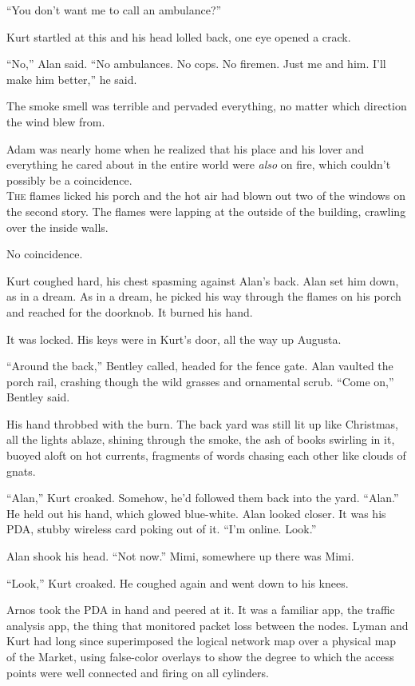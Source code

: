 \documentclass{article}
\begin{document}
``You don't want me to call an ambulance?''

Kurt startled at this and his head lolled back, one eye opened a
crack.

``No,'' Alan said.  ``No ambulances.  No cops.  No firemen.  Just me
and him.  I'll make him better,'' he said.

The smoke smell was terrible and pervaded everything, no matter which
direction the wind blew from. 

Adam was nearly home when he realized that his place and his lover and
everything he cared about in the entire world were \textit{also} on
fire, which couldn't possibly be a coincidence.
\\
\lettrine[lines=3, lhang=.5, nindent=0pt, findent=2pt]{T}{he} flames licked his porch and the hot air had blown out two of the
windows on the second story.  The flames were lapping at the outside
of the building, crawling over the inside walls. 

No coincidence. 

Kurt coughed hard, his chest spasming against Alan's back.  Alan set
him down, as in a dream.  As in a dream, he picked his way through the
flames on his porch and reached for the doorknob.  It burned his hand. 

It was locked.  His keys were in Kurt's door, all the way up Augusta.

``Around the back,'' Bentley called, headed for the fence gate.  Alan
vaulted the porch rail, crashing though the wild grasses and
ornamental scrub.  ``Come on,'' Bentley said.

His hand throbbed with the burn.  The back yard was still lit up like
Christmas, all the lights ablaze, shining through the smoke, the ash
of books swirling in it, buoyed aloft on hot currents, fragments of
words chasing each other like clouds of gnats.

``Alan,'' Kurt croaked.  Somehow, he'd followed them back into the
yard.  ``Alan.'' He held out his hand, which glowed blue-white.  Alan
looked closer.  It was his PDA, stubby wireless card poking out of it. 
``I'm online.  Look.''

Alan shook his head.  ``Not now.'' Mimi, somewhere up there was Mimi. 

``Look,'' Kurt croaked.  He coughed again and went down to his knees. 

Arnos took the PDA in hand and peered at it.  It was a familiar app,
the traffic analysis app, the thing that monitored packet loss between
the nodes.  Lyman and Kurt had long since superimposed the logical
network map over a physical map of the Market, using false-color
overlays to show the degree to which the access points were well
connected and firing on all cylinders. 
\end{document}
